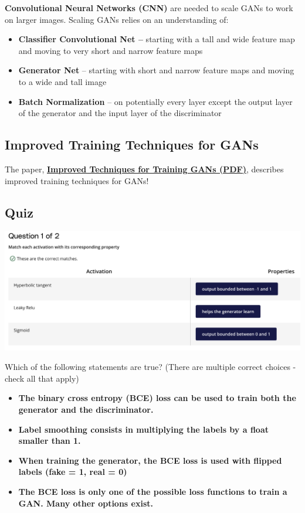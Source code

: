 \textbf{Convolutional Neural Networks (CNN)} are needed to scale GANs to work on larger images. Scaling GANs relies on an understanding of:

\begin{itemize}
    \item \textbf{Classifier Convolutional Net –} starting with a tall and wide feature map and moving to very short and narrow feature maps
    \item \textbf{Generator Net} – starting with short and narrow feature maps and moving to a wide and tall image
    \item \textbf{Batch Normalization} – on potentially every layer except the output layer of the generator and the input layer of the discriminator
\end{itemize}

\subsection{Improved Training Techniques for GANs}

The paper, \href{https://video.udacity-data.com/topher/2018/November/5bea0c6a_improved-training-techniques/improved-training-techniques.pdf}{\textbf{Improved Techniques for Training GANs (PDF)}}, describes improved training techniques for GANs!

\subsection{Quiz}

\includegraphics[width=1\linewidth]{img//genAdvNet//gan/quiz2.png}

Which of the following statements are true? (There are multiple correct choices - check all that apply)
\begin{itemize}
    \item \textbf{The binary cross entropy (BCE) loss can be used to train both the generator and the discriminator.}
    \item \textbf{Label smoothing consists in multiplying the labels by a float smaller than 1.}
    \item \textbf{When training the generator, the BCE loss is used with flipped labels (fake = 1, real = 0)}
    \item \textbf{The BCE loss is only one of the possible loss functions to train a GAN. Many other options exist.}
\end{itemize}

